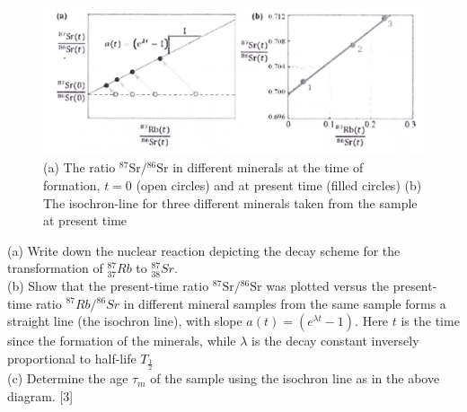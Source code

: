 \documentclass{article}
\begin{document}
\begin{figure}
	\centering
	\includegraphics[width=0.5\linewidth]{spho_book_TYS_images/2014q10.png}
	\caption{(a) The ratio ${ }^{87} \mathrm{Sr} /{ }^{86} \mathrm{Sr}$ in different minerals at the time of formation, $t=0$ (open circles) and at present time (filled circles) (b) The isochron-line for three different minerals taken from the sample at present time}
\end{figure}
(a) Write down the nuclear reaction depicting the decay scheme for the transformation of ${ }_{37}^{87} R b$ to ${ }_{38}^{87} Sr$. \\
(b) Show that the present-time ratio ${ }^{87} \mathrm{Sr} /{ }^{86} \mathrm{Sr}$ was plotted versus the present-time ratio ${ }^{87} R b /{ }^{86} S r$ in different mineral samples from the same sample forms a straight line (the isochron line), with slope $a(t)=\left(e^{\lambda t}-1\right) .$ Here $t$ is the time since the formation of the minerals, while $\lambda$ is the decay constant inversely proportional to half-life $T_{\frac{1}{2}}$ \\
(c) Determine the age $\tau_{m}$ of the sample using the isochron line as in the above diagram. [3]
\end{document}
